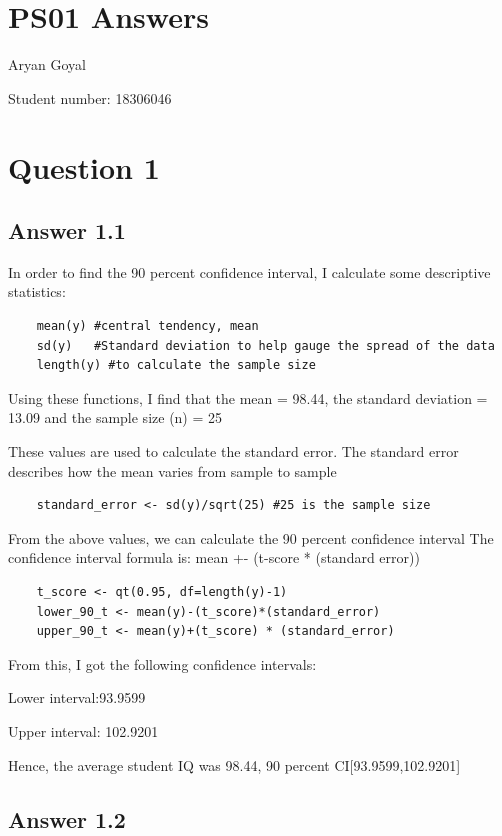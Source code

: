 \documentclass{article}
\begin{document}
\section{PS01 Answers}
Aryan Goyal

\noindent Student number: 18306046

\section{Question 1}
    
\subsection{Answer 1.1}
In order to find the 90 percent confidence interval, I calculate some descriptive statistics:
\begin{verbatim}
    mean(y) #central tendency, mean
    sd(y)   #Standard deviation to help gauge the spread of the data
    length(y) #to calculate the sample size
\end{verbatim}

Using these functions, I find that the mean = 98.44, 
the standard deviation = 13.09 and the sample size (n) = 25

\noindent
These values are used to calculate the standard error.
The standard error describes how the mean varies from sample to sample

\begin{verbatim}
    standard_error <- sd(y)/sqrt(25) #25 is the sample size
\end{verbatim}

From the above values, we can calculate the 90 percent confidence interval
The confidence interval formula is: mean +- (t-score * (standard error))
\begin{verbatim}
    t_score <- qt(0.95, df=length(y)-1) 
    lower_90_t <- mean(y)-(t_score)*(standard_error) 
    upper_90_t <- mean(y)+(t_score) * (standard_error)
\end{verbatim}
From this, I got the following confidence intervals:

\begin{center} 
Lower interval:93.9599

Upper interval: 102.9201
\end{center}  
Hence, the average student IQ was 98.44, 90 percent CI[93.9599,102.9201]

\subsection{Answer 1.2}
\end{document}
